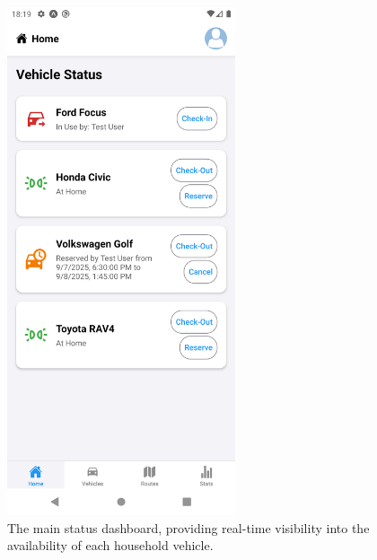 \begin{figure}[H]
    \centering
    \includegraphics[width=0.6\textwidth]{images/results/status_dashboard_screen.png}
    \caption{The main status dashboard, providing real-time visibility into the availability of each household vehicle.}
    \label{fig:status-dashboard-screen}
\end{figure}

